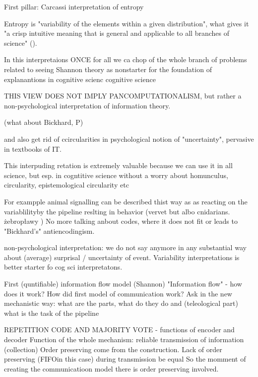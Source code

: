 \documentclass[10pt, aspectratio=169]{beamer}
\begin{document}
\begin{frame}[label=carcassi_entropy] {First pillar: Carcassi interpretation of entropy}

Entropy is "variability of the elements within a given distribution", what gives it "a crisp intuitive meaning that is general and applicable to all branches of science" (\cite{carcassi_variability_2021}).

In this interpretaions ONCE for all we ca chop of the whole branch of problems related to seeing Shannon theory as nonstarter for the foundation of explanantions in cognitive scienc  cognitive science


THIS VIEW DOES NOT IMPLY PANCOMPUTATIONALISM, but rather a non-psychological interpretation of information theory.

(what about Bickhard, P)

and also get rid of ccircularities in psychological notion of "uncertainty", pervasive in textbooks of IT.

This interpuding retation is extremely valuable because we can use it in all science, but esp. in cogntitive science without a worry about homunculus, circularity, epistemological circularity etc

For exampple animal signalling can be described thist way as as reacting on the variablilityby the pipeline reslting in behavior (vervet but albo cnidarians. żebropławy )
No more talking anbout codes, where it does not fit or leads to "Bickhard's" antiencodingism. 

non-psychological interpretation: we do not say anymore in any substantial way about (average) surprisal / uncertainty of event.
Variability interpretations is better starter fo cog sci interpretatons.
 

\end{frame}



\begin{frame}[label=shannon_flow] {First (quntifiable) information flow model (Shannon)}
    "Information flow" - how does it work?
    How did first model of communication work?
    Ask in the new mechanistic way: what are the parts, what do they do and (teleological part) what is the task of the pipeline

    REPETITION CODE AND MAJORITY VOTE - functions of encoder and decoder 
    Function of the whole mechanism: reliable transmission of information (collection)
    Order preserving come from the construction.
    Lack of order preserving (FIFOin this case) during transmission  be equal 
    So the momment of creating the communicatioon model there is order preserving involved.
     
\end{frame}
\end{document}
